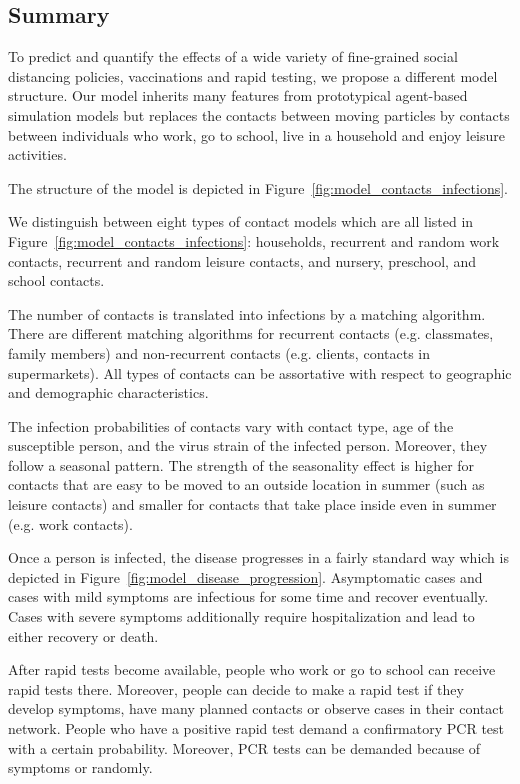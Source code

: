 \subsection{Summary}
\label{sub:model_summary}

To predict and quantify the effects of a wide variety of fine-grained social distancing
policies, vaccinations and rapid testing, we propose a different model structure. Our
model inherits many features from prototypical agent-based simulation models but
replaces the contacts between moving particles by contacts between individuals who work,
go to school, live in a household and enjoy leisure activities.

The structure of the model is depicted in Figure~\ref{fig:model_contacts_infections}.

We distinguish between eight types of contact
models which are all listed in Figure~\ref{fig:model_contacts_infections}: households,
recurrent and random work contacts, recurrent and random leisure contacts, and nursery,
preschool, and school contacts.

The number of contacts is translated into infections by a matching algorithm.
There are different matching algorithms for recurrent contacts (e.g. classmates, family
members) and non-recurrent contacts (e.g. clients, contacts in supermarkets).
All types of contacts can be assortative with respect to geographic and demographic
characteristics.

The infection probabilities of contacts vary with contact type, age of the susceptible
person, and the virus strain of the infected person. Moreover, they follow a seasonal
pattern. The strength of the seasonality effect is higher for contacts that are easy to
be moved to an outside location in summer (such as leisure contacts) and smaller for
contacts that take place inside even in summer (e.g. work contacts).

Once a person is infected, the disease progresses in a fairly standard way which is
depicted in Figure~\ref{fig:model_disease_progression}. Asymptomatic cases and cases with mild
symptoms are infectious for some time and recover eventually. Cases with severe symptoms
additionally require hospitalization and lead to either recovery or death.

After rapid tests become available, people who work or go to school can receive rapid
tests there. Moreover, people can decide to make a rapid test if they develop symptoms,
have many planned contacts or observe cases in their contact network. People who have a
positive rapid test demand a confirmatory PCR test with a certain probability. Moreover,
PCR tests can be demanded because of symptoms or randomly.

